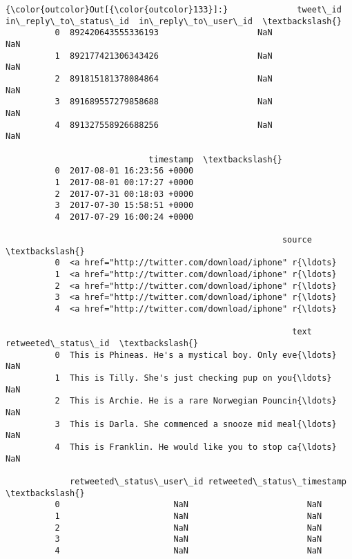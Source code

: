 \documentclass[11pt]{article}
\begin{document}
\begin{Verbatim}[commandchars=\\\{\}]
{\color{outcolor}Out[{\color{outcolor}133}]:}              tweet\_id  in\_reply\_to\_status\_id  in\_reply\_to\_user\_id  \textbackslash{}
          0  892420643555336193                    NaN                  NaN   
          1  892177421306343426                    NaN                  NaN   
          2  891815181378084864                    NaN                  NaN   
          3  891689557279858688                    NaN                  NaN   
          4  891327558926688256                    NaN                  NaN   
          
                             timestamp  \textbackslash{}
          0  2017-08-01 16:23:56 +0000   
          1  2017-08-01 00:17:27 +0000   
          2  2017-07-31 00:18:03 +0000   
          3  2017-07-30 15:58:51 +0000   
          4  2017-07-29 16:00:24 +0000   
          
                                                        source  \textbackslash{}
          0  <a href="http://twitter.com/download/iphone" r{\ldots}   
          1  <a href="http://twitter.com/download/iphone" r{\ldots}   
          2  <a href="http://twitter.com/download/iphone" r{\ldots}   
          3  <a href="http://twitter.com/download/iphone" r{\ldots}   
          4  <a href="http://twitter.com/download/iphone" r{\ldots}   
          
                                                          text  retweeted\_status\_id  \textbackslash{}
          0  This is Phineas. He's a mystical boy. Only eve{\ldots}                  NaN   
          1  This is Tilly. She's just checking pup on you{\ldots}                  NaN   
          2  This is Archie. He is a rare Norwegian Pouncin{\ldots}                  NaN   
          3  This is Darla. She commenced a snooze mid meal{\ldots}                  NaN   
          4  This is Franklin. He would like you to stop ca{\ldots}                  NaN   
          
             retweeted\_status\_user\_id retweeted\_status\_timestamp  \textbackslash{}
          0                       NaN                        NaN   
          1                       NaN                        NaN   
          2                       NaN                        NaN   
          3                       NaN                        NaN   
          4                       NaN                        NaN   
          

\end{Verbatim}
\end{document}

